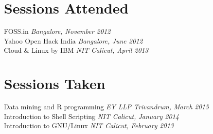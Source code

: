 \documentclass[margin,line]{resume}
\begin{document}
\begin{resume}
      
   

%
%   
%	
%	
%	 



    \section{\mysidestyle Sessions Attended} 
	FOSS.in \hfill \textit{Bangalore, November 2012}  \\%
    Yahoo Open Hack India \hfill \textit{Bangalore, June 2012}    \\
    Cloud \& Linux by IBM \hfill \textit{NIT Calicut, April 2013}    \\

            


    \section{\mysidestyle Sessions Taken} 
	Data mining and R programming \hfill \textit{EY LLP Trivandrum, March 2015}    \\
	Introduction to Shell Scripting \hfill \textit{NIT Calicut, January 2014}    \\    	
	Introduction to GNU/Linux \hfill \textit{NIT Calicut, February 2013}    \\
		    			


\end{resume}
\end{document}
